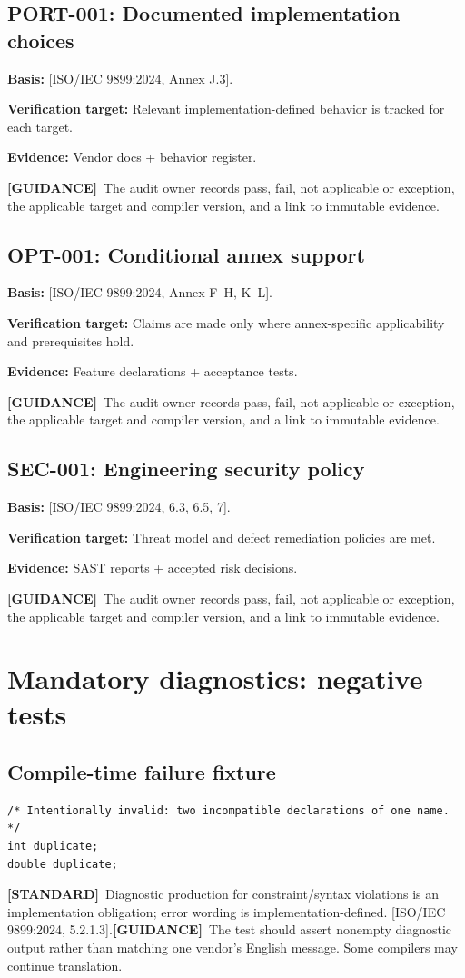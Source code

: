 \documentclass[10pt,letterpaper,oneside]{report}
\newcommand{\refcl}[1]{\textsf{\footnotesize[ISO/IEC 9899:2024, #1]}}
\newcommand{\standard}{\textbf{[STANDARD]}}
\newcommand{\guidance}{\textbf{[GUIDANCE]}}
\begin{document}
\section{PORT-001: Documented implementation choices}
\textbf{Basis:} \refcl{Annex J.3}.\par\textbf{Verification target:} Relevant implementation-defined behavior is tracked for each target.\par\textbf{Evidence:} Vendor docs + behavior register.\par\guidance\ The audit owner records pass, fail, not applicable or exception, the applicable target and compiler version, and a link to immutable evidence.
\section{OPT-001: Conditional annex support}
\textbf{Basis:} \refcl{Annex F--H, K--L}.\par\textbf{Verification target:} Claims are made only where annex-specific applicability and prerequisites hold.\par\textbf{Evidence:} Feature declarations + acceptance tests.\par\guidance\ The audit owner records pass, fail, not applicable or exception, the applicable target and compiler version, and a link to immutable evidence.
\section{SEC-001: Engineering security policy}
\textbf{Basis:} \refcl{6.3, 6.5, 7}.\par\textbf{Verification target:} Threat model and defect remediation policies are met.\par\textbf{Evidence:} SAST reports + accepted risk decisions.\par\guidance\ The audit owner records pass, fail, not applicable or exception, the applicable target and compiler version, and a link to immutable evidence.
\chapter{Mandatory diagnostics: negative tests}
\section{Compile-time failure fixture}
\begin{lstlisting}
/* Intentionally invalid: two incompatible declarations of one name. */
int duplicate;
double duplicate;
\end{lstlisting}
\standard\ Diagnostic production for constraint/syntax violations is an implementation obligation; error wording is implementation-defined. \refcl{5.2.1.3}.\guidance\ The test should assert nonempty diagnostic output rather than matching one vendor's English message. Some compilers may continue translation.
\end{document}

